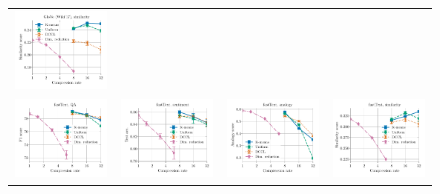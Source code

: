 \begin{figure}
\begin{tabular}{@{\hskip -0.0in}c@{\hskip -0.0in}c@{\hskip -0.0in}c@{\hskip -0.0in}c@{\hskip -0.0in}}
		\includegraphics[width=.245\linewidth]{figures/glove-wiki400k-am_intrinsics_bruni_men_vs_compression_linx_stoc.pdf} \\
		\includegraphics[width=.245\linewidth]{figures/fasttext1m_qa_best-f1_vs_compression_linx_stoc.pdf} &
		\includegraphics[width=.245\linewidth]{figures/fasttext1m_sentiment_sst_test-acc_vs_compression_linx_stoc.pdf} &
		\includegraphics[width=.245\linewidth]{figures/fasttext1m_intrinsics_google-mul_vs_compression_linx_stoc.pdf} &
		\includegraphics[width=.245\linewidth]{figures/fasttext1m_intrinsics_bruni_men_vs_compression_linx_stoc.pdf} \\


\end{tabular}
\end{figure}
